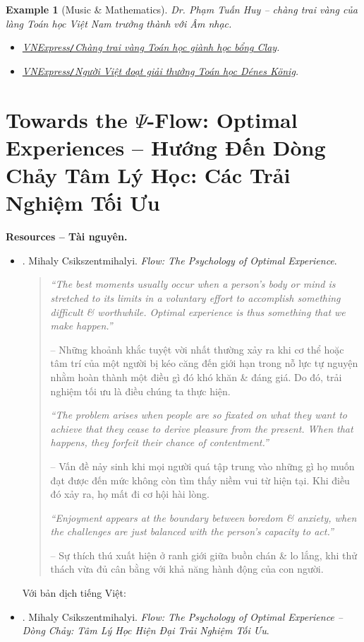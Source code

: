 \documentclass[12pt]{article}
\newtheorem{example}{Example}
\begin{document}
\begin{example}[Music \& Mathematics]
	Dr. {\sc Phạm Tuấn Huy} -- chàng trai vàng của làng Toán học Việt Nam trưởng thành với Âm nhạc.	
	\begin{itemize}
		\item \href{https://vnexpress.net/chang-trai-vang-toan-hoc-gianh-hoc-bong-clay-4564121.html}{VNExpress{\tt/}Chàng trai vàng Toán học giành học bổng Clay}.
		\item \href{https://vnexpress.net/nguoi-viet-doat-giai-thuong-toan-hoc-denes-k-nig-4742548.html}{VNExpress{\tt/}Người Việt đoạt giải thưởng Toán học Dénes König}.
	\end{itemize}
\end{example}


\section{Towards the $\Psi$-Flow: Optimal Experiences -- Hướng Đến Dòng Chảy Tâm Lý Học: Các Trải Nghiệm Tối Ưu}
\noindent\textbf{\textsf{Resources -- Tài nguyên.}}
\begin{itemize}
	\item \cite{Csikszentmihalyi_flow}. {\sc Mihaly Csikszentmihalyi}. {\it Flow: The Psychology of Optimal Experience}.
	\begin{quotation}
		{\it``The best moments usually occur when a person's body or mind is stretched to its limits in a voluntary effort to accomplish something difficult \& worthwhile. Optimal experience is thus something that we make happen.''}
		
		-- Những khoảnh khắc tuyệt vời nhất thường xảy ra khi cơ thể hoặc tâm trí của một người bị kéo căng đến giới hạn trong nỗ lực tự nguyện nhằm hoàn thành một điều gì đó khó khăn \& đáng giá. Do đó, trải nghiệm tối ưu là điều chúng ta thực hiện.
		
		{\it``The problem arises when people are so fixated on what they want to achieve that they cease to derive pleasure from the present. When that happens, they forfeit their chance of contentment.''}
		
		-- Vấn đề nảy sinh khi mọi người quá tập trung vào những gì họ muốn đạt được đến mức không còn tìm thấy niềm vui từ hiện tại. Khi điều đó xảy ra, họ mất đi cơ hội hài lòng.
		
		{\it``Enjoyment appears at the boundary between boredom \& anxiety, when the challenges are just balanced with the person's capacity to act.''}
		
		-- Sự thích thú xuất hiện ở ranh giới giữa buồn chán \& lo lắng, khi thử thách vừa đủ cân bằng với khả năng hành động của con người.		
	\end{quotation}
	Với bản dịch tiếng Việt:
	\item \cite{Csikszentmihalyi_flow_VN}. {\sc Mihaly Csikszentmihalyi}. {\it Flow: The Psychology of Optimal Experience -- Dòng Chảy: Tâm Lý Học Hiện Đại Trải Nghiệm Tối Ưu}.
\end{itemize}
\end{document}
